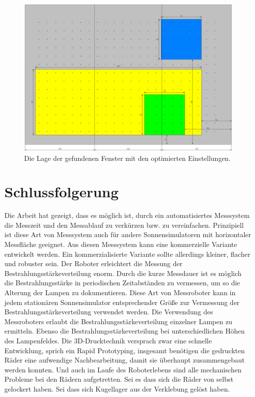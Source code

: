 \documentclass[a4paper,bibtotoc,oneside]{scrbook}
\begin{document}
\begin{figure}[htbp]
\centering
\includegraphics[width=140mm]{img/fensteropt.png}
\caption{Die Lage der gefundenen Fenster mit den optimierten Einstellungen.}\label{fopt}
\end{figure}



\FloatBarrier
 
\section{Schlussfolgerung}\thispagestyle{empty}

Die Arbeit hat gezeigt, dass es möglich ist, durch ein automatisiertes Messsystem die Messzeit und den Messablauf zu verkürzen bzw. zu vereinfachen.
Prinzipiell ist diese Art von Messsystem auch für andere Sonnensimulatoren mit horizontaler Messfläche geeignet.
Aus diesen Messsystem kann eine kommerzielle Variante entwickelt werden.
Ein kommerzialisierte Variante sollte allerdings kleiner, flacher und robuster sein.
Der Roboter erleichtert die Messung der Bestrahlungsstärkeverteilung enorm. Durch die kurze Messdauer ist es möglich die Bestrahlungsstärke in periodischen Zeitabständen zu vermessen, um so die Alterung der Lampen zu dokumentieren. 
Diese Art von Messroboter kann in jedem stationären Sonnensimulator entsprechender Größe zur Vermessung der Bestrahlungsstärkeverteilung verwendet werden. 
Die Verwendung des Messroboters erlaubt die Bestrahlungsstärkeverteilung einzelner Lampen zu ermitteln.
Ebenso die Bestrahlungsstärkeverteilung bei unterschiedlichen Höhen des Lampenfeldes.
Die 3D-Drucktechnik versprach zwar eine schnelle Entwicklung, sprich ein Rapid Prototyping, insgesamt benötigen die gedruckten Räder eine aufwendige Nachbearbeitung, damit sie überhaupt zusammengebaut werden konnten. Und auch im Laufe des Roboterlebens sind alle mechanischen Probleme bei den Rädern aufgetretten. Sei es dass sich die Räder von selbst gelockert haben. Sei dass sich Kugellager aus der Verklebung gelöst haben. 
\end{document}
